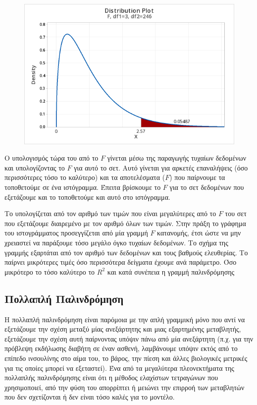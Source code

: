 \begin{figure}[H]
    \centering
    \includegraphics[width=1\textwidth]{images/F - pvalue.png}
    \caption{}
\end{figure}

Ο υπολογισμός τώρα του  από το $F$ γίνεται μέσω της παραγωγής τυχαίων δεδομένων
και υπολογίζοντας το $F$ για αυτό το σετ. Αυτό γίνεται για αρκετές επαναλήψεις (όσο
περισσότερες τόσο το καλύτερο) και τα αποτελέσματα ($F$) που παίρνουμε τα τοποθετούμε σε
ένα ιστόγραμμα. Έπειτα βρίσκουμε το $F$ για το σετ δεδομένων που εξετάζουμε και το
τοποθετούμε και αυτό στο ιστόγραμμα.

Το  υπολογίζεται από τον αριθμό των τιμών
που είναι μεγαλύτερες από το $F$ του σετ που εξετάζουμε διαιρεμένο με τον αριθμό όλων των
τιμών. Στην πράξη το γράφημα του ιστογράμματος προσεγγίζεται από μία γραμμή $F$
κατανομής, έτσι ώστε να μην χρειαστεί να παράξουμε τόσο μεγάλο όγκο τυχαίων δεδομένων.
Το σχήμα της γραμμής εξαρτάται από τον αριθμό των δεδομένων και τους βαθμούς
ελευθερίας. Το  παίρνει μικρότερες τιμές όσο περισσότερα δείγματα έχουμε ανά
παράμετρο. Όσο μικρότερο το  τόσο καλύτερο το $R^2$
και κατά συνέπεια η γραμμή
παλινδρόμησης
\subsection{Πολλαπλή Παλινδρόμηση}
Η πολλαπλή παλινδρόμηση είναι παρόμοια με την απλή γραμμική μόνο που αντί να
εξετάζουμε την σχέση μεταξύ μίας ανεξάρτητης και μιας εξαρτημένης μεταβλητής,
εξετάζουμε την σχέση αυτή παίρνοντας υπόψιν πάνω από μία ανεξάρτητη (π.χ. για την
πρόβλεψη εκδήλωσης διαβήτη σε έναν ασθενή, λαμβάνουμε υπόψιν εκτός από το επίπεδο
ινσουλίνης στο αίμα του, το βάρος, την πίεση και άλλες βιολογικές μετρικές για τις οποίες
μπορεί να εξεταστεί). Ένα από τα μεγαλύτερα πλεονεκτήματα της πολλαπλής παλινδρόμησης
είναι ότι η μέθοδος ελαχίστων τετραγώνων που χρησιμοποιεί, από την φύση του απορρίπτει
ή μειώνει την επιρροή των μεταβλητών που δεν σχετίζονται ή δεν είναι τόσο καλές για το
μοντέλο.

